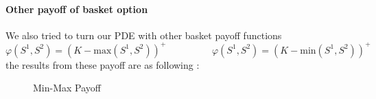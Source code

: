 \documentclass[a4paper,10pt]{article}
\begin{document}
\paragraph{Other payoff of basket option}
We also tried to turn our PDE with other basket payoff functions
\[
\varphi(S^1,S^2) = (K- \text{max}(S^1,S^2) )^+
\hspace{2cm}
\varphi(S^1,S^2) = (K- \text{min}(S^1,S^2) )^+
\]
the results from these payoff are as following :
\begin{figure}[ht]
\centering
{}
\quad
{}
\caption[Payoff ]{Min-Max Payoff}
\label{fig:other_payoof}
\end{figure}
\end{document}
